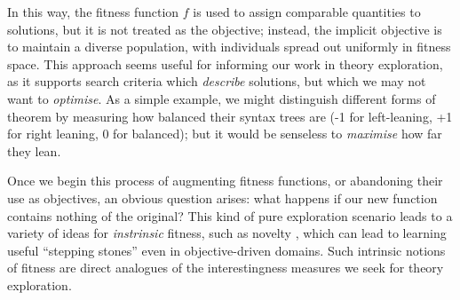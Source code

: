 In this way, the fitness function $f$ is used to assign comparable quantities to
solutions, but it is not treated as the objective; instead, the implicit
objective is to maintain a diverse population, with individuals spread out
uniformly in fitness space. This approach seems useful for informing our work in
theory exploration, as it supports search criteria which \emph{describe}
solutions, but which we may not want to \emph{optimise}. As a simple example, we
might distinguish different forms of theorem by measuring how balanced their
syntax trees are (-1 for left-leaning, +1 for right leaning, 0 for balanced);
but it would be senseless to \emph{maximise} how far they lean.

Once we begin this process of augmenting fitness functions, or abandoning their
use as objectives, an obvious question arises: what happens if our new function
contains nothing of the original? This kind of pure exploration scenario leads
to a variety of ideas for \emph{instrinsic} fitness, such as novelty
\cite{lehman2011abandoning}, which can lead to learning useful ``stepping
stones'' even in objective-driven domains. Such intrinsic notions of fitness are
direct analogues of the interestingness measures we seek for theory exploration.
